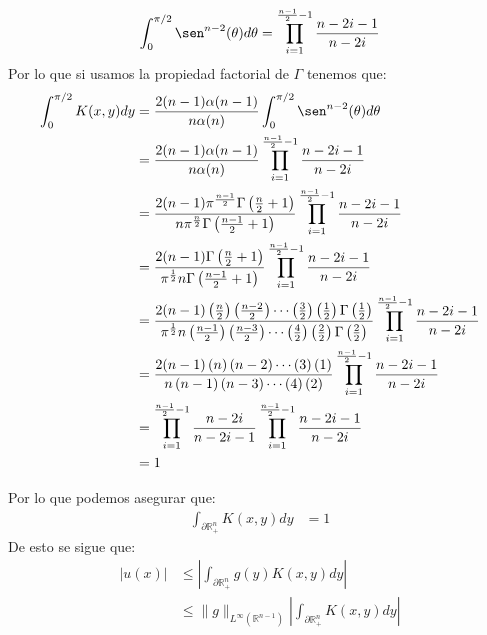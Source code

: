 \begin{homeworkProblem}
\begin{enumerate}
\begin{solucion}
\begin{itemize}
\begin{align*}
            \int_{0}^{\pi/2}\sen^{n-2}(\theta)d\theta=\prod_{i=1}^{\frac{n-1}{2}-1}\frac{n-2i-1}{n-2i}
          \end{align*}
          Por lo que si usamos la propiedad factorial de $\Gamma$ tenemos que:
          \begin{align*} 
            \int_{0}^{\pi/2}K(x,y)dy&=\frac{2(n-1)\alpha(n-1)}{n\alpha(n)}\int_{0}^{\pi/2}\sen^{n-2}(\theta)d\theta\\
            &=\frac{2(n-1)\alpha(n-1)}{n\alpha(n)}\prod_{i=1}^{\frac{n-1}{2}-1}\frac{n-2i-1}{n-2i}\\
            &=\frac{2(n-1)\pi^{\frac{n-1}{2}}\Gamma\left( \frac{n}{2}+1 \right)}{n\pi^{\frac{n}{2}}\Gamma\left( \frac{n-1}{2}+1 \right)}\prod_{i=1}^{\frac{n-1}{2}-1}\frac{n-2i-1}{n-2i}\\
            &=\frac{2(n-1)\Gamma\left( \frac{n}{2}+1 \right)}{\pi^{\frac{1}{2}}n\Gamma\left( \frac{n-1}{2}+1 \right)}\prod_{i=1}^{\frac{n-1}{2}-1}\frac{n-2i-1}{n-2i}\\
            &=\frac{2(n-1)\left( \frac{n}{2} \right)\left( \frac{n-2}{2} \right)\cdots\left( \frac{3}{2} \right)\left( \frac{1}{2} \right)\Gamma\left( \frac{1}{2} \right)}{\pi^{\frac{1}{2}}n\left( \frac{n-1}{2} \right)\left( \frac{n-3}{2} \right)\cdots\left( \frac{4}{2} \right)\left( \frac{2}{2} \right)\Gamma\left( \frac{2}{2} \right)}\prod_{i=1}^{\frac{n-1}{2}-1}\frac{n-2i-1}{n-2i}\\
            &=\frac{2(n-1)\left( n \right)\left( n-2 \right)\cdots\left( 3 \right)\left( 1 \right)}{n\left( n-1 \right)\left( n-3 \right)\cdots\left( 4 \right)\left( 2 \right)}\prod_{i=1}^{\frac{n-1}{2}-1}\frac{n-2i-1}{n-2i}\\
            &=\prod_{i=1}^{\frac{n-1}{2}-1}\frac{n-2i}{n-2i-1}\prod_{i=1}^{\frac{n-1}{2}-1}\frac{n-2i-1}{n-2i}\\
            &=1
          \end{align*}
      \end{itemize}
      Por lo que podemos asegurar que:
      \begin{align*}
        \int_{\partial \mathbb{R}^{n}_{+}}K(x,y)dy&=1
      \end{align*}
      De esto se sigue que:
      \begin{align*}
        |u(x)|&\leq \left|\int_{\partial \mathbb{R}^{n}_{+}}g(y)K(x,y)dy\right|\\
        &\leq \|g\|_{L^{\infty}(\mathbb{R}^{n-1})}\left| \int_{\partial \mathbb{R}^{n}_{+}} K(x,y)dy \right|\\

\end{align*}
\end{solucion}
\end{enumerate}
\end{homeworkProblem}

